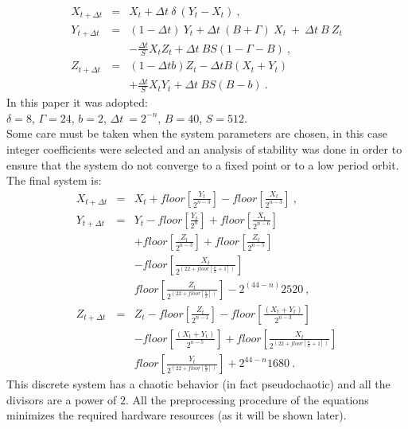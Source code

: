 \begin{eqnarray}\label{eq:Lorenz2}
{X}_{t+\Delta t}&=& {X}_{t} + \Delta t \ \delta~\left( {Y}_{t} -
{X}_{t} \right)
\ ,\nonumber \\
{Y}_{t+\Delta t}&=&(1- \Delta t )~{Y}_{t}+ \Delta t \
(B+\Gamma)~{X}_{t}~+~
\Delta t ~B~{Z}_{t} \nonumber\\
&~&-{\frac{\Delta t}{S}}{X}_{t}{Z}_{t}+ \Delta t \ BS(1-\Gamma-B) \ ,\\
{Z}_{t+\Delta t}&=&(1-\Delta t b){Z}_{t}-\Delta t B\left( {X}_{t}
+
{Y}_{t} \right)\nonumber \\
&&+{\frac{\Delta t}{S}}{X}_{t}{Y}_{t}+ \Delta t \ BS(B-b) \ .
\nonumber
\end{eqnarray}
%
In this paper it was adopted: \\

$\delta=8$, $\Gamma=24$, $b=2$, $\Delta t \ =2^{-n}$,
$B=40$, $S=512$. \\

Some care must be taken when the system parameters are chosen, in
this case integer coefficients were selected
and an analysis of stability was done in order to
ensure that the system do not converge to a fixed point or to a low
period orbit.
%
The final system is:
\begin{eqnarray}\label{eq:Lorenz3}
{X}_{t+\Delta t}&=&{X}_{t}+floor\left[ {\frac{{Y}_{t}}{2^{{n-3}}}}
\right] -floor\left[{\frac{{X}_{t}}{2^{{n-3}}}}\right] \ , \nonumber \\
{Y}_{t+\Delta t}&=&{Y}_{t}-floor\left[
{\frac{{Y}_{t}}{2^n}}\right]
+floor\left[{\frac{{X}_{t}}{2^{{n-6}}}}\right]\nonumber \\
&& +floor\left[ {\frac{{Z}_{t}}{2^{{n-3}}}}\right] +
floor\left[{\frac{{Z}_{t}}{2^{{n-5}}}}\right]\nonumber \\
&&-floor\left[ {\frac{{X}_{t}}{2^{( 22+floor\left[
{\frac{n}{2}+1}\right] )}
}}\right] \nonumber \\
&& floor\left[ {\frac{{Z}_{t}}{2^{( 22+floor\left[
{\frac{n}{2}}\right] )}}}\right] -2^{(44-n)}2520 \ , \\
{Z}_{t+\Delta t}&=&{Z}_{t}-floor\left[
{\frac{{Z}_{t}}{2^{n-1}}}\right] -floor\left[
{\frac{({X}_{t}+{Y}_{t})}{2^{n-3}}}\right]\nonumber \\
&& -floor\left[ {\frac{({X}_{t}+{Y}_{t})}{2^{n-5}}}\right]
+floor\left[ {\frac{{X}_{t}}{2^{( 22+floor\left[
{\frac{n}{2}+1}\right]
)}}}\right] \nonumber \\
&& floor\left[ {\frac{{Y}_{t}}{2^{( 22+floor\left[
{\frac{n}{2}}\right] )}}}\right]+2^{44-n}1680 \ . \nonumber
\end{eqnarray}
%
This discrete system has a chaotic behavior (in fact
pseudochaotic) and all the divisors are a power of $2$.  All the
preprocessing procedure of the equations minimizes the required
hardware resources (as it will be shown later).
